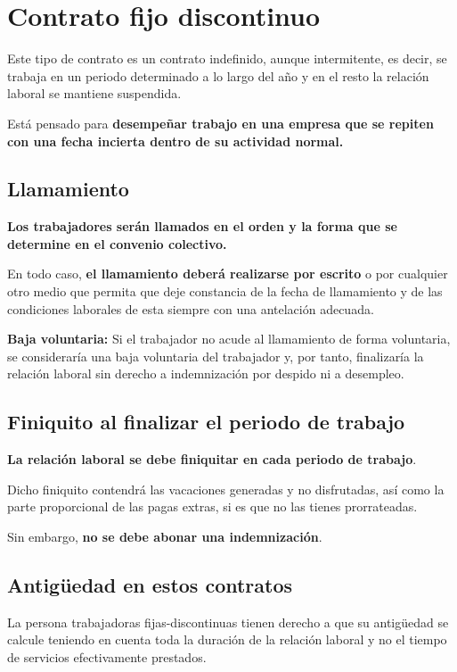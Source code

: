 \documentclass{article}
\begin{document}
	\section*{Contrato fijo discontinuo}
	
	Este tipo de contrato es un contrato indefinido, aunque intermitente, es decir, se trabaja en un periodo determinado a lo largo del año y en el resto la relación laboral se mantiene suspendida.
	
	Está pensado para \textbf{desempeñar trabajo en una empresa que se repiten con una fecha incierta dentro de su actividad normal.}
	
	\subsection*{Llamamiento}
	
	\textbf{Los trabajadores serán llamados en el orden y la forma que se determine en el convenio colectivo.}
	
	En todo caso, \textbf{el llamamiento deberá realizarse por escrito} o por cualquier otro medio que permita que deje constancia de la fecha de llamamiento y de las condiciones laborales de esta siempre con una antelación adecuada.
	
	\textbf{Baja voluntaria:} Si el trabajador no acude al llamamiento de forma voluntaria, se consideraría una baja voluntaria del trabajador y, por tanto, finalizaría la relación laboral sin derecho a indemnización por despido ni a desempleo.
	
	\subsection*{Finiquito al finalizar el periodo de trabajo}
	
	\textbf{La relación laboral se debe finiquitar en cada periodo de trabajo}.
	
	Dicho finiquito contendrá las vacaciones generadas y no disfrutadas, así como la parte proporcional de las pagas extras, si es que no las tienes prorrateadas.
	
	Sin embargo, \textbf{no se debe abonar una indemnización}.
	
	\subsection*{Antigüedad en estos contratos}
	
	La persona trabajadoras fijas-discontinuas tienen derecho a que su antigüedad se calcule teniendo en cuenta toda la duración de la relación laboral y no el tiempo de servicios efectivamente prestados.
	
\end{document}
